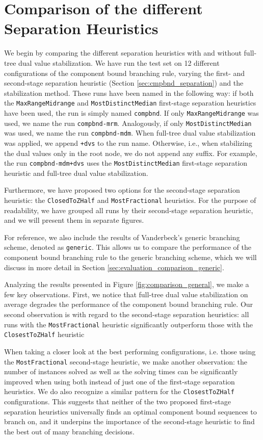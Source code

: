\section{Comparison of the different Separation Heuristics}\label{sec:evaluation_comparison_separation}
We begin by comparing the different separation heuristics with and without full-tree dual value stabilization. We have run the test set on 12 different configurations of the component bound branching rule, varying the first- and second-stage separation heuristic (Section \ref{sec:cmpbnd_separation}) and the stabilization method. These runs have been named in the following way: if both the \texttt{MaxRangeMidrange} and \texttt{MostDistinctMedian} first-stage separation heuristics have been used, the run is simply named \texttt{compbnd}. If only \texttt{MaxRangeMidrange} was used, we name the run \texttt{compbnd-mrm}. Analogously, if only \texttt{MostDistinctMedian} was used, we name the run \texttt{compbnd-mdm}. When full-tree dual value stabilization was applied, we append \texttt{+dvs} to the run name. Otherwise, i.e., when stabilizing the dual values only in the root node, we do not append any suffix. For example, the run \texttt{compbnd-mdm+dvs} uses the \texttt{MostDistinctMedian} first-stage separation heuristic and full-tree dual value stabilization.

Furthermore, we have proposed two options for the second-stage separation heuristic: the \texttt{ClosedToZHalf} and \texttt{MostFractional} heuristics. For the purpose of readability, we have grouped all runs by their second-stage separation heuristic, and we will present them in separate figures.

For reference, we also include the results of Vanderbeck's generic branching scheme, denoted as \texttt{generic}. This allows us to compare the performance of the component bound branching rule to the generic branching scheme, which we will discuss in more detail in Section \ref{sec:evaluation_comparison_generic}.

Analyzing the results presented in Figure \ref{fig:comparison_general}, we make a few key observations. First, we notice that full-tree dual value stabilization on average degrades the performance of the component bound branching rule. Our second observation is with regard to the second-stage separation heuristics: all runs with the \texttt{MostFractional} heuristic significantly outperform those with the \texttt{ClosestToZHalf} heuristic

When taking a closer look at the best performing configurations, i.e. those using the \texttt{MostFractional} second-stage heuristic, we make another observation: the number of instances solved as well as the solving times can be significantly improved when using both instead of just one of the first-stage separation heuristics. We do also recognize a similar pattern for the \texttt{ClosestToZHalf} configurations. This suggests that neither of the two proposed first-stage separation heuristics universally finds an optimal component bound sequences to branch on, and it underpins the importance of the second-stage heuristic to find the best out of many branching decisions.

